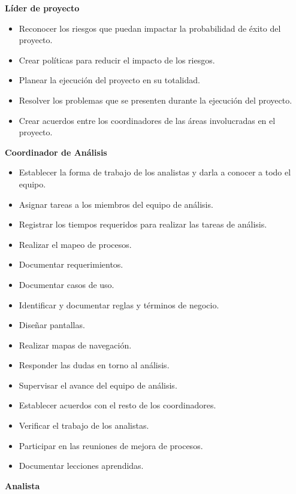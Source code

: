 \documentclass[10pt]{article}
\begin{document}
\textbf{Líder de proyecto}
\begin{itemize}
 \item Reconocer los riesgos que puedan impactar la probabilidad de éxito del proyecto.
 \item Crear políticas para reducir el impacto de los riesgos.
 \item Planear la ejecución del proyecto en su totalidad.
 \item Resolver los problemas que se presenten durante la ejecución del proyecto.
 \item Crear acuerdos entre los coordinadores de las áreas involucradas en el proyecto.\\
\end{itemize}

\textbf{Coordinador de Análisis}
\begin{itemize}
 \item Establecer la forma de trabajo de los analistas y darla a conocer a todo el equipo.
 \item Asignar tareas a los miembros del equipo de análisis.
 \item Registrar los tiempos requeridos para realizar las tareas de análisis.
 \item Realizar el mapeo de procesos.
 \item Documentar requerimientos.
 \item Documentar casos de uso.
 \item Identificar y documentar reglas y términos de negocio.
 \item Diseñar pantallas.
 \item Realizar mapas de navegación.
 \item Responder las dudas en torno al análisis.
 \item Supervisar el avance del equipo de análisis.
 \item Establecer acuerdos con el resto de los coordinadores.
 \item Verificar el trabajo de los analistas.
 \item Participar en las reuniones de mejora de procesos.
 \item Documentar lecciones aprendidas.\\
\end{itemize}
\newpage 
\textbf{Analista}
\end{document}
